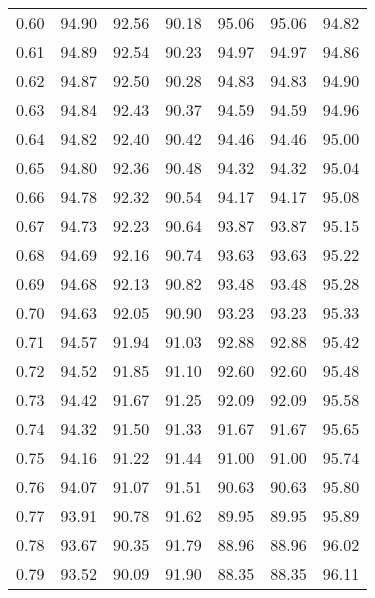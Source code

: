 \begin{tabular}{|c|c|c|c|c|c|c|}
      0.60 &     94.90 &     92.56 &      90.18 &   95.06 &      95.06 &         94.82 \\
      0.61 &     94.89 &     92.54 &      90.23 &   94.97 &      94.97 &         94.86 \\
      0.62 &     94.87 &     92.50 &      90.28 &   94.83 &      94.83 &         94.90 \\
      0.63 &     94.84 &     92.43 &      90.37 &   94.59 &      94.59 &         94.96 \\
      0.64 &     94.82 &     92.40 &      90.42 &   94.46 &      94.46 &         95.00 \\
      0.65 &     94.80 &     92.36 &      90.48 &   94.32 &      94.32 &         95.04 \\
      0.66 &     94.78 &     92.32 &      90.54 &   94.17 &      94.17 &         95.08 \\
      0.67 &     94.73 &     92.23 &      90.64 &   93.87 &      93.87 &         95.15 \\
      0.68 &     94.69 &     92.16 &      90.74 &   93.63 &      93.63 &         95.22 \\
      0.69 &     94.68 &     92.13 &      90.82 &   93.48 &      93.48 &         95.28 \\
      0.70 &     94.63 &     92.05 &      90.90 &   93.23 &      93.23 &         95.33 \\
      0.71 &     94.57 &     91.94 &      91.03 &   92.88 &      92.88 &         95.42 \\
      0.72 &     94.52 &     91.85 &      91.10 &   92.60 &      92.60 &         95.48 \\
      0.73 &     94.42 &     91.67 &      91.25 &   92.09 &      92.09 &         95.58 \\
      0.74 &     94.32 &     91.50 &      91.33 &   91.67 &      91.67 &         95.65 \\
      0.75 &     94.16 &     91.22 &      91.44 &   91.00 &      91.00 &         95.74 \\
      0.76 &     94.07 &     91.07 &      91.51 &   90.63 &      90.63 &         95.80 \\
      0.77 &     93.91 &     90.78 &      91.62 &   89.95 &      89.95 &         95.89 \\
      0.78 &     93.67 &     90.35 &      91.79 &   88.96 &      88.96 &         96.02 \\
      0.79 &     93.52 &     90.09 &      91.90 &   88.35 &      88.35 &         96.11 \\

\end{tabular}
